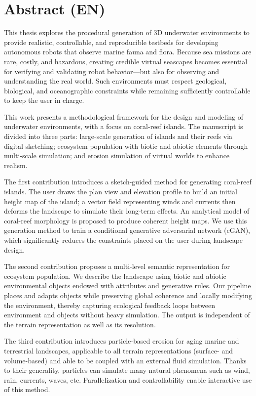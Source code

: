 \clearpage
\pagebreak


\section*{Abstract (EN)}
This thesis explores the procedural generation of 3D underwater environments to provide realistic, controllable, and reproducible testbeds for developing autonomous robots that observe marine fauna and flora. Because sea missions are rare, costly, and hazardous, creating credible virtual seascapes becomes essential for verifying and validating robot behavior—but also for observing and understanding the real world. Such environments must respect geological, biological, and oceanographic constraints while remaining sufficiently controllable to keep the user in charge.

This work presents a methodological framework for the design and modeling of underwater environments, with a focus on coral-reef islands. The manuscript is divided into three parts: large-scale generation of islands and their reefs via digital sketching; ecosystem population with biotic and abiotic elements through multi-scale simulation; and erosion simulation of virtual worlds to enhance realism.

The first contribution introduces a sketch-guided method for generating coral-reef islands. The user draws the plan view and elevation profile to build an initial height map of the island; a vector field representing winds and currents then deforms the landscape to simulate their long-term effects. An analytical model of coral-reef morphology is proposed to produce coherent height maps. We use this generation method to train a conditional generative adversarial network (cGAN), which significantly reduces the constraints placed on the user during landscape design.

The second contribution proposes a multi-level semantic representation for ecosystem population. We describe the landscape using biotic and abiotic environmental objects endowed with attributes and generative rules. Our pipeline places and adapts objects while preserving global coherence and locally modifying the environment, thereby capturing ecological feedback loops between environment and objects without heavy simulation. The output is independent of the terrain representation as well as its resolution.

The third contribution introduces particle-based erosion for aging marine and terrestrial landscapes, applicable to all terrain representations (surface- and volume-based) and able to be coupled with an external fluid simulation. Thanks to their generality, particles can simulate many natural phenomena such as wind, rain, currents, waves, etc. Parallelization and controllability enable interactive use of this method.

